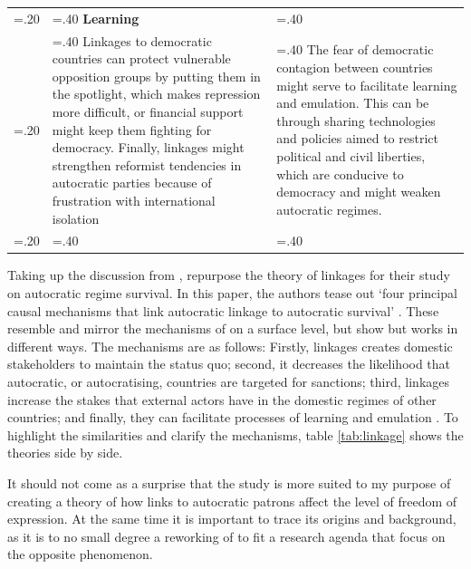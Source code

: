 \begin{table}[p]
{\begin{tabularx}{\textwidth} {
 >{\centering\arraybackslash\hsize=.20\hsize}X 
 >{\noindent\justifying\arraybackslash\hsize=.40\hsize}X 
 >{\noindent\justifying\arraybackslash\hsize=.40\hsize}X}
 & \textbf{Learning} \\
\addlinespace
 & Linkages to democratic countries can protect vulnerable opposition groups by putting them in the spotlight, which makes repression more difficult, or financial support might keep them fighting for democracy. Finally, linkages might strengthen reformist tendencies in autocratic parties because of frustration with international isolation
 & The fear of democratic contagion between countries might serve to facilitate learning and emulation. This can be through sharing technologies and policies aimed to restrict political and civil liberties, which are conducive to democracy and might weaken autocratic regimes. \\
\bottomrule
 
 \multicolumn{3}{p{\textwidth}}{\raggedright{\textit{Mechanisms are found in \citet[pp. 383-386]{levitsky_linkage_2006} and \citet[pp. 1225-1227]{tansey_ties_2017}}}}

\end{tabularx}
} %
\end{table}

Taking up the discussion from \citeauthor{levitsky_linkage_2006}, \citet{tansey_ties_2017} repurpose the theory of linkages for their study on autocratic regime survival. In this paper, the authors tease out `four principal causal mechanisms that link autocratic linkage to autocratic survival' \citep[p. 1225]{tansey_ties_2017}. These resemble and mirror the mechanisms of \citeauthor{levitsky_linkage_2006} on a surface level, but show but works in different ways. The mechanisms are as follows: Firstly, linkages creates domestic stakeholders to maintain the status quo; second, it decreases the likelihood that autocratic, or autocratising, countries are targeted for sanctions; third, linkages increase the stakes that external actors have in the domestic regimes of other countries; and finally, they can facilitate processes of learning and emulation \citep[pp. 1225-1227]{tansey_ties_2017}. To highlight the similarities and clarify the mechanisms, table \ref{tab:linkage} shows the theories side by side. 

It should not come as a surprise that the \citeauthor{tansey_ties_2017} study is more suited to my purpose of creating a theory of how links to autocratic patrons affect the level of freedom of expression. At the same time it is important to trace its origins and background, as it is to no small degree a reworking of \citeauthor{levitsky_linkage_2006} to fit a research agenda that focus on the opposite phenomenon. 

